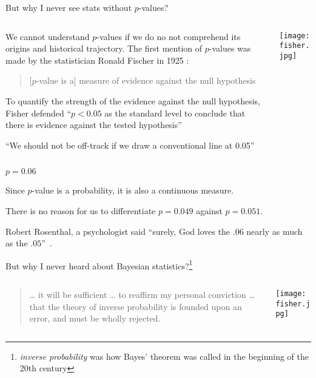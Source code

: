 \begin{frame}{But why I never see stats without $p$-values?}
	\begin{columns}
		\begin{column}{0.8\textwidth}
			We cannot understand $p$-values if we do no not comprehend its origins and historical trajectory.
			The first mention of $p$-values was made by the statistician Ronald Fischer in 1925 \parencite{fisher1925statistical}:
			\begin{quotation} [$p$-value is a] measure of evidence against the null hypothesis
			\end{quotation}
			\begin{vfilleditems}
				\item To quantify the strength of the evidence against the null hypothesis, Fisher defended ``$p<0.05$ as the standard level to conclude that there is evidence against the tested hypothesis'' \item ``We should not be off-track if we draw a conventional line at 0.05''
			\end{vfilleditems}
		\end{column}
		\begin{column}{0.2\textwidth} \centering \texttt{[image: fisher.jpg]}
		\end{column}
	\end{columns}
\end{frame}

\begin{frame}{$p = 0.06$}
	\begin{vfilleditems}
		\item Since $p$-value is a probability, it is also a continuous measure.
		\item There is no reason for us to differentiate $p = 0.049$ against $p = 0.051$.
		\item Robert Rosenthal, a psychologist said ``surely, God loves the $.06$ nearly as much as the $.05$''~\parencite{rosnow1989statistical}.
	\end{vfilleditems}
\end{frame}

\begin{frame}{But why I never heard about Bayesian statistics?\footnote{\textit{inverse probability}
			was how Bayes' theorem was called in the beginning of the 20th century}}
	\begin{columns}
		\begin{column}{0.8\textwidth}
			\begin{quotation}
				… it will be sufficient … to reaffirm my personal conviction …
				that the theory of inverse probability is founded upon an error,
				and must be wholly rejected.
			\end{quotation}
			\vfill \vfill
			\textcite{fisher1925statistical}
		\end{column}
		\begin{column}{0.2\textwidth}
			\centering
			\texttt{[image: fisher.jpg]}
		\end{column}
	\end{columns}
\end{frame}


